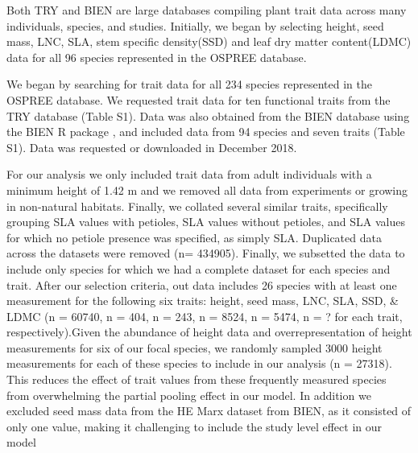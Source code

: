 \documentclass{article}\usepackage[]{graphicx}\usepackage[]{color}
\begin{document}
Both TRY and BIEN are large databases compiling plant trait data across many individuals, species, and studies. Initially, we began by selecting height, seed mass, LNC, SLA, stem specific density(SSD) and leaf dry matter content(LDMC) data for all 96 species represented in the OSPREE database.  


We began by searching for trait data for all 234 species represented in the OSPREE database. We requested trait data for ten functional traits from the TRY database (Table S1). Data was also obtained from the BIEN database using the BIEN R package \citep{Maitner2017}, and included data from 94 species and seven traits (Table S1). Data was requested or downloaded in December 2018. 

For our analysis we only included trait data from adult individuals with a minimum height of 1.42 m and we removed all data from experiments or growing in non-natural habitats. Finally, we collated several similar traits, specifically grouping SLA values with petioles, SLA values without petioles, and SLA values for which no petiole presence was specified, as simply SLA. Duplicated data across the datasets were removed (n= 434905). Finally, we subsetted the data to include only species for which we had a complete dataset for each species and trait. After our selection criteria, out data includes 26 species with at least one measurement for the following six traits: height, seed mass, LNC, SLA, SSD, \& LDMC (n = 60740, n = 404, n = 243, n = 8524, n = 5474, n = ? for each trait, respectively).Given the abundance of height data and overrepresentation of height measurements for six of our focal species, we randomly sampled 3000 height measurements for each of these species to include in our analysis (n = 27318). This reduces the effect of trait values from these frequently measured species from overwhelming the partial pooling effect in our model. In addition we excluded seed mass data from the HE Marx dataset from BIEN, as it consisted of only one value, making it challenging to include the study level effect in our model\\ %
\end{document}
